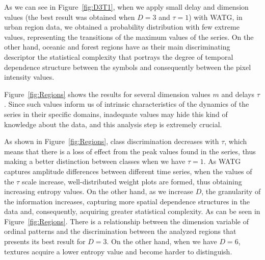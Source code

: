 \documentclass{isprs}
\begin{document}

As we can see in Figure~\ref{fig:D3T1}, when we apply small delay and dimension values (the best result was obtained when $D = 3$ and $\tau = 1$) with WATG, in urban region data, we obtained a probability distribution with few extreme values, representing the transitions of the maximum values of the series.
On the other hand, oceanic and forest regions have as their main discriminating descriptor the statistical complexity that portrays the degree of temporal dependence structure between the symbols and consequently between the pixel intensity values.

Figure~\ref{fig:Regions} shows the results for several dimension values $m$ and delays $\tau$.
Since such values inform us of intrinsic characteristics of the dynamics of the series in their specific domains, inadequate values may hide this kind of knowledge about the data, and this analysis step is extremely crucial.

As shown in Figure~\ref{fig:Regions}, class discrimination decreases with $\tau$, which means that there is a loss of effect from the peak values found in the series, thus making a better distinction between classes when we have $\tau = 1$.
As WATG captures amplitude differences between different time series, when the values of the $\tau$ scale increase, well-distributed weight plots are formed, thus obtaining increasing entropy values.
On the other hand, as we increase $D$, the granularity of the information increases, capturing more spatial dependence structures in the data and, consequently, acquiring greater statistical complexity.
As can be seen in Figure~\ref{fig:Regions}.
There is a relationship between the dimension variable of ordinal patterns and the discrimination between the analyzed regions that presents its best result for $D = 3$.
On the other hand, when we have $D = 6$, textures acquire a lower entropy value and become harder to distinguish.
\end{document}
